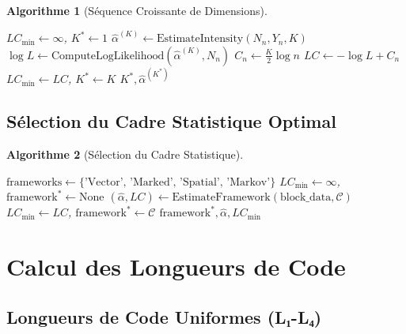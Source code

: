\documentclass[12pt,a4paper]{article}
\newtheorem{algo}{Algorithme}[section]
\begin{document}
	\begin{algo}[Séquence Croissante de Dimensions]
		\label{algo:sequence_dimensions}
		\begin{algorithmic}[1]
			\State $LC_{\text{min}} \gets \infty$, $K^* \gets 1$
			\State $\hat{\alpha}^{(K)} \gets \text{EstimateIntensity}(N_n, Y_n, K)$
			\State $\log L \gets \text{ComputeLogLikelihood}(\hat{\alpha}^{(K)}, N_n)$
			\State $C_n \gets \frac{K}{2} \log n$
			\State $LC \gets -\log L + C_n$
			\State $LC_{\text{min}} \gets LC$, $K^* \gets K$
			\EndIf
			\EndFor
			\State \Return $K^*, \hat{\alpha}^{(K^*)}$
			\EndProcedure
		\end{algorithmic}
	\end{algo}
	
	\subsection{Sélection du Cadre Statistique Optimal}
	\label{subsec:selection_cadre}
	
	\begin{algo}[Sélection du Cadre Statistique]
		\label{algo:selection_cadre}
		\begin{algorithmic}[1]
			\State $\text{frameworks} \gets \{\text{'Vector', 'Marked', 'Spatial', 'Markov'}\}$
			\State $LC_{\text{min}} \gets \infty$, $\text{framework}^* \gets \text{None}$
			\State $(\hat{\alpha}, LC) \gets \text{EstimateFramework}(\text{block\_data}, \mathcal{C})$
			\State $LC_{\text{min}} \gets LC$, $\text{framework}^* \gets \mathcal{C}$
			\EndIf
			\EndFor
			\State \Return $\text{framework}^*, \hat{\alpha}, LC_{\text{min}}$
			\EndProcedure
		\end{algorithmic}
	\end{algo}
	
	\section{Calcul des Longueurs de Code}
	\label{sec:longueurs_code}
	
	\subsection{Longueurs de Code Uniformes (L₁-L₄)}
	\label{subsec:longueurs_uniformes}
	
\end{document}
